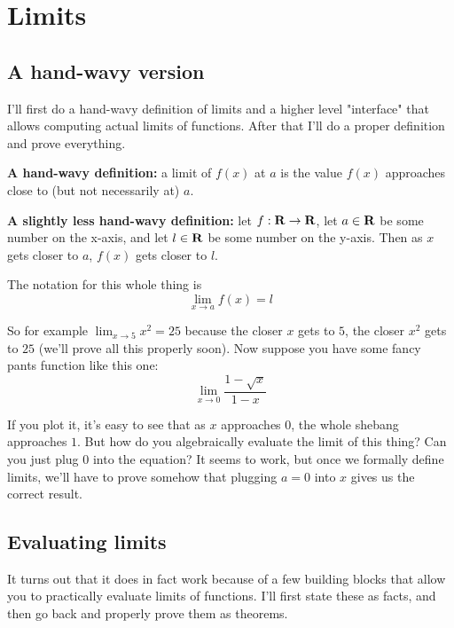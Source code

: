 \section{Limits}

\subsection{A hand-wavy version}

I'll first do a hand-wavy definition of limits and a higher level "interface" that allows computing actual limits of functions. After that I'll do a proper definition and prove everything.

\vs

\textbf{A hand-wavy definition:} a limit of $f(x)$ at $a$ is the value $f(x)$ approaches close to (but not necessarily at) $a$.

\vs

\textbf{A slightly less hand-wavy definition:} let $f:\mathbf{R}\to\mathbf{R}$, let $a\in\mathbf{R}$ be some number on the x-axis, and let $l\in\mathbf{R}$ be some number on the y-axis. Then as $x$ gets closer to $a$, $f(x)$ gets closer to $l$.

\vs

The notation for this whole thing is
\[\lim_{x\to a} f(x)=l\]

So for example $\lim_{x\to5}x^2=25$ because the closer $x$ gets to $5$, the closer $x^2$ gets to $25$ (we'll prove all this properly soon). Now suppose you have some fancy pants function like this one:
\[\lim_{x\to 0}\frac{1-\sqrt{x}}{1-x}\]

If you plot it, it's easy to see that as $x$ approaches $0$, the whole shebang approaches $1$. But how do you algebraically evaluate the limit of this thing? Can you just plug $0$ into the equation? It seems to work, but once we formally define limits, we'll have to prove somehow that plugging $a=0$ into $x$ gives us the correct result.

\subsection{Evaluating limits}

It turns out that it does in fact work because of a few building blocks that allow you to practically evaluate limits of functions. I'll first state these as facts, and then go back and properly prove them as theorems.

